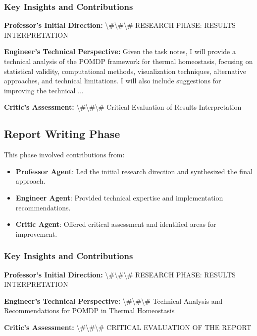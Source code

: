 \documentclass[11pt,a4paper]{article}
\begin{document}
\subsubsection{Key Insights and Contributions}


\textbf{Professor's Initial Direction:} \textbackslash{}#\textbackslash{}#\textbackslash{}# RESEARCH PHASE: RESULTS INTERPRETATION


\textbf{Engineer's Technical Perspective:} Given the task notes, I will provide a technical analysis of the POMDP framework for thermal homeostasis, focusing on statistical validity, computational methods, visualization techniques, alternative approaches, and technical limitations. I will also include suggestions for improving the technical ...


\textbf{Critic's Assessment:} \textbackslash{}#\textbackslash{}#\textbackslash{}# Critical Evaluation of Results Interpretation


\subsection{Report Writing Phase}


This phase involved contributions from:

\begin{itemize}
\item \textbf{Professor Agent}: Led the initial research direction and synthesized the final approach.
\item \textbf{Engineer Agent}: Provided technical expertise and implementation recommendations.
\item \textbf{Critic Agent}: Offered critical assessment and identified areas for improvement.
\end{itemize}

\subsubsection{Key Insights and Contributions}


\textbf{Professor's Initial Direction:} \textbackslash{}#\textbackslash{}#\textbackslash{}# RESEARCH PHASE: RESULTS INTERPRETATION


\textbf{Engineer's Technical Perspective:} \textbackslash{}#\textbackslash{}#\textbackslash{}# Technical Analysis and Recommendations for POMDP in Thermal Homeostasis


\textbf{Critic's Assessment:} \textbackslash{}#\textbackslash{}#\textbackslash{}# CRITICAL EVALUATION OF THE REPORT
\end{document}
